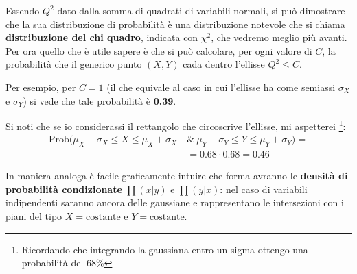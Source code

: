 \documentclass[openany,a4paper,12pt]{book}
\theoremstyle{remark}
\begin{document}
Essendo $Q^2$ dato dalla somma di quadrati di variabili normali, si può dimostrare che la sua distribuzione di probabilità è una distribuzione notevole che si chiama \textbf{distribuzione del chi quadro}, indicata con $\chi^2$, che vedremo meglio più avanti. Per ora quello che  è utile sapere è che si può calcolare, per ogni valore di $C$, la probabilità che il generico punto $(X,Y)$ cada dentro l'ellisse $Q^2 \le C$. 

Per esempio, per $C=1$ (il che equivale al caso in cui l'ellisse ha come semiassi $\sigma_X$ e $\sigma_Y$) si vede che tale probabilità è \textbf{0.39}.

\begin{center}
\end{center}

Si noti che se io considerassi il rettangolo che circoscrive l'ellisse, mi aspetterei \footnote{Ricordando che integrando la gaussiana entro un sigma ottengo una probabilità del 68\%}:
\begin{align*}
    \text{Prob}\Big( \mu_X - \sigma_X \le X \le \mu_X + \sigma_X \ &\&\ \mu_Y - \sigma_Y \le Y \le \mu_Y + \sigma_Y \Big) = \\
    &= 0.68 \cdot 0.68 = 0.46
\end{align*}

In maniera analoga è facile graficamente intuire che forma avranno le \textbf{densità di probabilità condizionate} $\prod(x|y)$ e $\prod(y|x)$: nel caso di variabili indipendenti saranno ancora delle gaussiane e rappresentano le intersezioni con i piani del tipo $X = \text{costante}$ e $Y = \text{costante}$.
\end{document}
